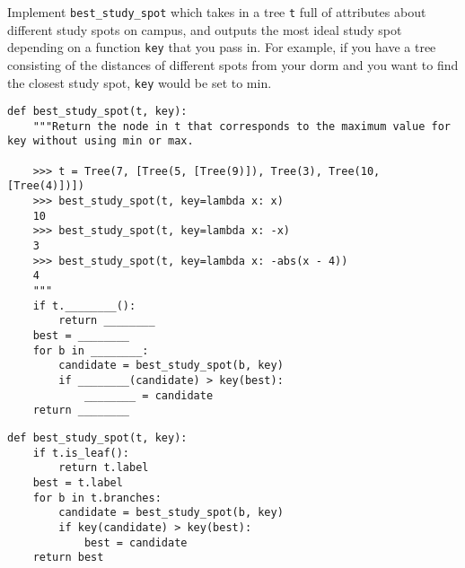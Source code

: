 \begin{blocksection}
\question Implement \lstinline$best_study_spot$ which takes in a tree \lstinline$t$ full of attributes about different study spots on campus, and outputs the most ideal study spot depending on a function \lstinline$key$ that you pass in. For example, if you have a tree consisting of the distances of different spots from your dorm and you want to find the closest study spot, \lstinline$key$ would be set to min.

\begin{lstlisting}
def best_study_spot(t, key):
    """Return the node in t that corresponds to the maximum value for key without using min or max.

    >>> t = Tree(7, [Tree(5, [Tree(9)]), Tree(3), Tree(10, [Tree(4)])])
    >>> best_study_spot(t, key=lambda x: x)
    10
    >>> best_study_spot(t, key=lambda x: -x)
    3
    >>> best_study_spot(t, key=lambda x: -abs(x - 4))
    4
    """
    if t.________():
        return ________
    best = ________
    for b in ________:
        candidate = best_study_spot(b, key)
        if ________(candidate) > key(best):
            ________ = candidate
    return ________
\end{lstlisting}

\begin{solution}[0.7in]
\begin{lstlisting}
def best_study_spot(t, key):
    if t.is_leaf():
        return t.label
    best = t.label
    for b in t.branches:
        candidate = best_study_spot(b, key)
        if key(candidate) > key(best):
            best = candidate
    return best
\end{lstlisting}
\end{solution}
\end{blocksection}
